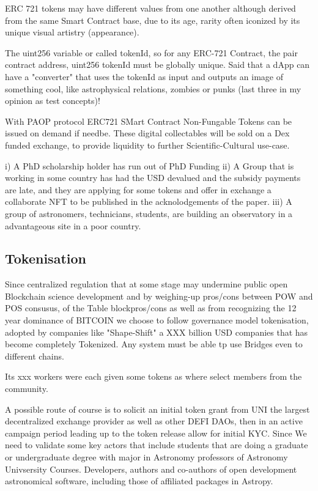 \documentclass[final,5p,times,twocolumn,authoryear]{elsarticle}
\begin{document}
ERC 721 tokens may have different values from one another although derived from the same Smart Contract base, due to its age, rarity often iconized by its unique visual artistry (appearance).

The uint256 variable or called tokenId, so for any ERC-721 Contract, the pair contract address, uint256 tokenId must be globally unique. Said that a dApp can have a "converter" that uses the tokenId as input and outputs an image of something cool, like astrophysical relations,  zombies or punks (last three in my opinion as test concepts)!


With PAOP protocol ERC721 SMart Contract Non-Fungable Tokens can be issued on demand if needbe. These digital collectables will be sold on a Dex funded exchange, to provide liquidity to further Scientific-Cultural use-case.

i) A PhD scholarship holder has run out of PhD Funding 
ii) A Group that is working in some country has had the USD devalued and the subsidy payments are late, and they are applying for some tokens and offer in exchange a collaborate NFT to be published in the acknolodgements of the paper.
iii) A group of astronomers, technicians, students,  are building an observatory in a advantageous site in a poor country. 

\subsection{Tokenisation}

Since centralized regulation that at some stage may undermine public open Blockchain science development and by weighing-up pros/cons between POW and POS consusus, of the Table blockpros/cons as well as from recognizing the 12 year dominance of BITCOIN we choose to follow governance model tokenisation, adopted by  companies like "Shape-Shift" a XXX billion USD companies that has become completely Tokenized. Any system must be able tp use Bridges even to different chains. 

Its xxx workers were each given some tokens as where select members from the community. 

A possible route of course is to solicit an initial token grant from UNI the largest decentralized exchange provider as well as other DEFI DAOs, then in an active campaign period leading up to the token release allow for initial KYC. Since We need to validate some key actors that include students that are doing a graduate or undergraduate degree with major in Astronomy professors of Astronomy Univsersity Courses. Developers, authors and co-authors of open development astronomical software, including those of affiliated packages in Astropy. 
\end{document}
